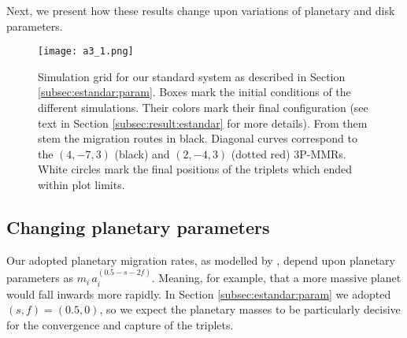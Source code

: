 \documentclass[baaa]{baaa}
\begin{document}
Next, we present how these results change upon variations of planetary and disk parameters.



\begin{figure}[!t]
\centering
\texttt{[image: a3\_1.png]}
\caption{Simulation grid for our standard system as described in Section \ref{subsec:estandar:param}.
Boxes mark the initial conditions of the different simulations. 
Their colors mark their final configuration (see text in Section \ref{subsec:result:estandar} for more details).
From them stem the migration routes in black.
Diagonal curves correspond to the $(4,-7,3)$ (black) and $(2,-4,3)$ (dotted red) 3P-MMRs.
White circles mark the final positions of the triplets which ended within plot limits.}
\label{fig:modelo}
\end{figure}


\subsection{Changing planetary parameters}

Our adopted planetary migration rates, as modelled by \cite{tanaka.ward.2004}, depend upon planetary parameters as $m_i\,a_i^{(0.5-s-2f)}$.
Meaning, for example, that a more massive planet would fall inwards more rapidly.
In Section \ref{subsec:estandar:param} we adopted $(s,f)=(0.5,0)$, so we expect the planetary masses to be particularly decisive for the convergence and capture of the triplets.

\end{document}
